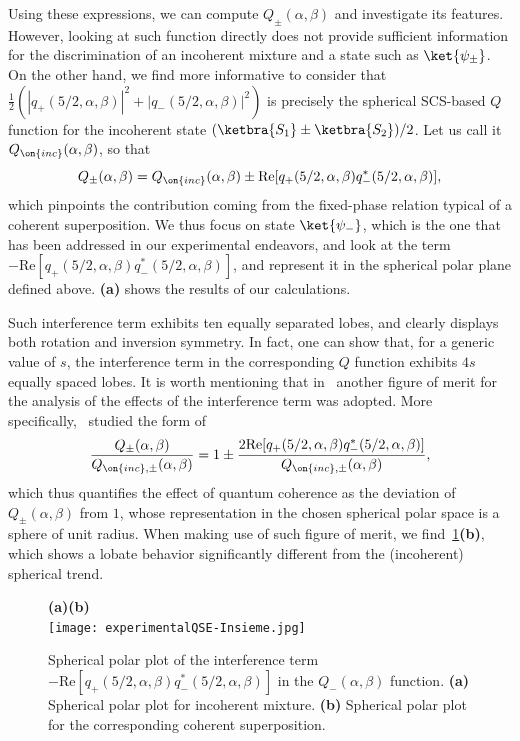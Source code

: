 Using these expressions, we can compute $Q_\pm(\alpha,\beta)$ and investigate its features. However, looking at such function directly does not provide sufficient information for the discrimination of an incoherent mixture and a state such as $\ket{\psi_\pm}$.
On the other hand, we find more informative to consider that $\frac12\left(|q_+(5/2,\alpha,\beta)|^2+|q_-(5/2,\alpha,\beta)|^2\right)$ is precisely the spherical SCS-based $Q$ function for the incoherent state $(\ketbra{S_1}\pm\ketbra{S_2})/2$. Let us call it $Q_{\on{inc}}(\alpha,\beta)$, so that 
\begin{equation}
Q_\pm(\alpha,\beta)=Q_{\on{inc}}(\alpha,\beta) \pm \text{Re}[q_+(5/2,\alpha,\beta)q^*_-(5/2,\alpha,\beta)],
\end{equation}
which pinpoints the contribution coming from the fixed-phase relation typical of a coherent superposition. We thus focus on state $\ket{\psi_-}$, which is the one that has been addressed in our experimental endeavors, and look at the term $-\text{Re}[q_+(5/2,\alpha,\beta)q^*_-(5/2,\alpha,\beta)]$, and represent it in the spherical polar plane defined above. \textbf{(a)} shows the results of our calculations. 

Such interference term exhibits ten equally separated lobes, and clearly displays both rotation and inversion symmetry. In fact, one can show that, for a generic value of $s$, the interference term in the corresponding $Q$ function exhibits $4s$ equally spaced lobes. It is worth mentioning that in~\cite{agarwal1997atomic} another figure of merit for the analysis of the effects of the interference term was adopted. More specifically,~\cite{agarwal1997atomic} studied the form of 
\begin{equation}
    \frac{Q_\pm(\alpha,\beta)}{Q_{\on{inc},\pm}(\alpha,\beta)} =
    1 \pm \frac{2\text{Re}[q_+(5/2,\alpha,\beta)q^*_-(5/2,\alpha,\beta)]}{Q_{\on{inc},\pm}(\alpha,\beta)},
\end{equation}
which thus quantifies the effect of quantum coherence as the deviation of $Q_\pm(\alpha,\beta)$ from $1$, whose representation in the chosen spherical polar space is a sphere of unit radius. When making use of such figure of merit, we find~\cref{fig:expQWs:SCS_plots}\textbf{(b)}, which shows a lobate behavior significantly different from the (incoherent) spherical trend. 

\begin{figure}[tb]
    \centering
    {\bf (a)}\hskip8cm{\bf (b)}\\
    \texttt{[image: experimentalQSE-Insieme.jpg]}
    \caption{Spherical polar plot of the interference term $-\text{Re}[q_+(5/2,\alpha,\beta)q^*_-(5/2,\alpha,\beta)]$ in the $Q_-(\alpha,\beta)$ function. \textbf{(a)} Spherical polar plot for incoherent mixture. \textbf{(b)} Spherical polar plot for the corresponding coherent superposition.}
    \label{fig:expQWs:SCS_plots}
\end{figure}



